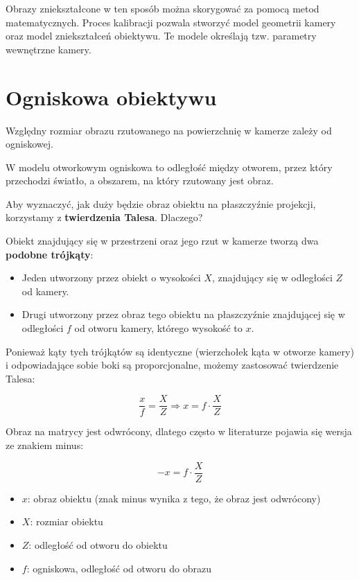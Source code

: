 \documentclass[magisterska]{pracadypl}
\begin{document}
Obrazy zniekształcone w ten sposób można skorygować za pomocą metod matematycznych. Proces kalibracji pozwala stworzyć model geometrii kamery oraz model zniekształceń obiektywu. Te modele określają tzw. parametry wewnętrzne kamery.

\section{Ogniskowa obiektywu}

Względny rozmiar obrazu rzutowanego na powierzchnię w kamerze zależy od ogniskowej.

W modelu otworkowym ogniskowa to odległość między otworem, przez który przechodzi światło, a obszarem, na który rzutowany jest obraz.

Aby wyznaczyć, jak duży będzie obraz obiektu na płaszczyźnie projekcji, korzystamy z \textbf{twierdzenia Talesa}.  
Dlaczego?

Obiekt znajdujący się w przestrzeni oraz jego rzut w kamerze tworzą dwa \textbf{podobne trójkąty}:
\begin{itemize}
    \item Jeden utworzony przez obiekt o wysokości \( X \), znajdujący się w odległości \( Z \) od kamery.
    \item Drugi utworzony przez obraz tego obiektu na płaszczyźnie znajdującej się w odległości \( f \) od otworu kamery, którego wysokość to \( x \).
\end{itemize}

Ponieważ kąty tych trójkątów są identyczne (wierzchołek kąta w otworze kamery) i odpowiadające sobie boki są proporcjonalne, możemy zastosować twierdzenie Talesa:

\[
\frac{x}{f} = \frac{X}{Z} \Rightarrow x = f \cdot \frac{X}{Z}
\]

Obraz na matrycy jest odwrócony, dlatego często w literaturze pojawia się wersja ze znakiem minus:

\[
-x = f \cdot \frac{X}{Z}
\]

\begin{itemize}
  \item \textbf{$x$}: obraz obiektu (znak minus wynika z tego, że obraz jest odwrócony)
  \item \textbf{$X$}: rozmiar obiektu
  \item \textbf{$Z$}: odległość od otworu do obiektu
  \item \textbf{$f$}: ogniskowa, odległość od otworu do obrazu
\end{itemize}
\end{document}
